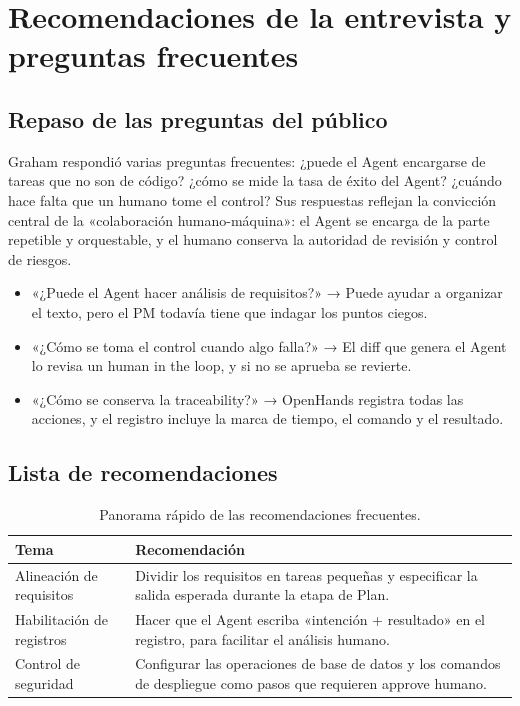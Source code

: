 \section{Recomendaciones de la entrevista y preguntas frecuentes}
\subsection{Repaso de las preguntas del público}
Graham respondió varias preguntas frecuentes: ¿puede el Agent encargarse de tareas que no son de código? ¿cómo se mide la tasa de éxito del Agent? ¿cuándo hace falta que un humano tome el control? Sus respuestas reflejan la convicción central de la «colaboración humano-máquina»: el Agent se encarga de la parte repetible y orquestable, y el humano conserva la autoridad de revisión y control de riesgos.

\begin{itemize}
    \item «¿Puede el Agent hacer análisis de requisitos?» → Puede ayudar a organizar el texto, pero el PM todavía tiene que indagar los puntos ciegos.
    \item «¿Cómo se toma el control cuando algo falla?» → El diff que genera el Agent lo revisa un human in the loop, y si no se aprueba se revierte.
    \item «¿Cómo se conserva la traceability?» → OpenHands registra todas las acciones, y el registro incluye la marca de tiempo, el comando y el resultado.
\end{itemize}

\subsection{Lista de recomendaciones}
\begin{table}[H]
\centering
\begin{tabular}{p{} p{}}
\toprule
Tema & Recomendación \\
\midrule
Alineación de requisitos & Dividir los requisitos en tareas pequeñas y especificar la salida esperada durante la etapa de Plan. \\
\midrule
Habilitación de registros & Hacer que el Agent escriba «intención + resultado» en el registro, para facilitar el análisis humano. \\
\midrule
Control de seguridad & Configurar las operaciones de base de datos y los comandos de despliegue como pasos que requieren approve humano. \\
\bottomrule
\end{tabular}
\caption{Panorama rápido de las recomendaciones frecuentes.}
\end{table}

